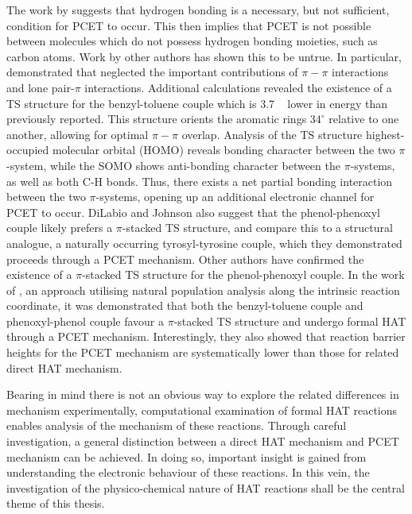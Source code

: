 The work by \citet{Mayer2002} suggests that hydrogen bonding is a necessary, but not sufficient, condition for PCET to occur. This then implies that PCET is not possible between molecules which do not possess hydrogen bonding moieties, such as carbon atoms. Work by other authors has shown this to be untrue.\cite{Hatcher2007, DiLabio2007} In particular, \citet{DiLabio2007} demonstrated that \citet{Mayer2002} neglected the important contributions of $\pi-\pi$ interactions and lone pair-$\pi$ interactions. Additional calculations revealed the existence of a TS structure for the benzyl-toluene couple which is 3.7 \kcalmol~ lower in energy than previously reported. This structure orients the aromatic rings $34^\circ$ relative to one another, allowing for optimal $\pi-\pi$ overlap.
Analysis of the TS structure highest-occupied molecular orbital (HOMO) reveals bonding character between the two $\pi$-system, while the SOMO shows anti-bonding character between the $\pi$-systems, as well as both C-H bonds. Thus, there exists a net partial bonding interaction between the two $\pi$-systems, opening up an additional electronic channel for PCET to occur. DiLabio and Johnson also suggest that the phenol-phenoxyl couple likely prefers a $\pi$-stacked TS structure, and compare this to a structural analogue, a naturally occurring tyrosyl-tyrosine couple, which they demonstrated proceeds through a PCET mechanism. Other authors have confirmed the existence of a $\pi$-stacked TS structure for the phenol-phenoxyl couple.\cite{Sirjoosingh2011, HammesSchiffer2015, MunozRugeles2017} In the work of \citet{MunozRugeles2017}, an approach utilising natural population analysis along the intrinsic reaction coordinate, it was demonstrated that both the benzyl-toluene couple and phenoxyl-phenol couple favour a $\pi$-stacked TS structure and undergo formal HAT through a PCET mechanism. Interestingly, they also showed that reaction barrier heights for the PCET mechanism are systematically lower than those for related direct HAT mechanism.

Bearing in mind there is not an obvious way to explore the related differences in mechanism experimentally, computational examination of formal HAT reactions enables analysis of the mechanism of these reactions. Through careful investigation, a general distinction between a direct HAT mechanism and PCET mechanism can be achieved. In doing so, important insight is gained from understanding the electronic behaviour of these reactions. In this vein, the investigation of the physico-chemical nature of HAT reactions shall be the central theme of this thesis.

